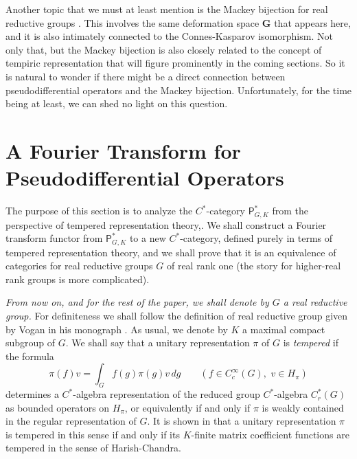 \documentclass[leqno,11pt]{amsart}
\numberwithin{equation}{subsection}
\theoremstyle{plain}
\theoremstyle{definition}
\theoremstyle{remark}
\newcommand{\PSDO}{\mathsf{P}}
\begin{document}
Another topic that we must at least mention is the Mackey bijection for real reductive groups \cite{Higson08,Afgoustidis19,Afgoustidis21}.  This involves the same deformation space $\pmb{G}$ that appears here, and it is also  intimately connected to the Connes-Kasparov isomorphism. Not only that, but the Mackey bijection is also  closely related to the concept of tempiric representation that will figure prominently in the coming sections. So it is natural to wonder if there might be a direct connection between pseudodifferential operators and the Mackey bijection.  Unfortunately, for the time being at least, we can shed no light on this question.

\section{A Fourier Transform for Pseudodifferential Operators}
\label{sec-fourier-iso-thm}


 The purpose of this section is to analyze the $C^*$-category $\PSDO^*_{G,K}$   
from the perspective of  tempered representation theory,. We shall construct a Fourier transform functor from $\PSDO^*_{G,K}$ to a new $C^*$-category, defined purely in terms of tempered representation theory, and   we shall prove that it is an equivalence of categories for real reductive groups $G$ of real rank one (the story for higher-real rank groups is more complicated).
 
\emph{From now on, and for the rest of the paper, we shall denote by  $G$ a real reductive group.} For definiteness we shall follow the definition of real reductive group  given by Vogan in his monograph \cite{VoganGreenBook}. As usual, we  denote by $K$ a maximal compact subgroup of $G$. We shall say that a unitary representation $\pi$  of $G$ is \emph{tempered} if the formula 
\[
\pi (f)v = \int _G f(g)\pi(g)v\, dg \qquad (f\in C_c^\infty (G),\,\, v\in H_\pi)
\]
determines a $C^*$-algebra representation of the reduced group $C^*$-algebra $C^*_r (G)$ as bounded operators on $H_\pi$, or equivalently if and only if $\pi$ is weakly contained in the regular representation of $G$.   It is shown in  \cite{CowlingHaagerupHowe} that a  unitary representation $\pi$ is tempered in this sense if and only if its $K$-finite matrix coefficient functions are tempered in the sense of Harish-Chandra. 
\end{document}
